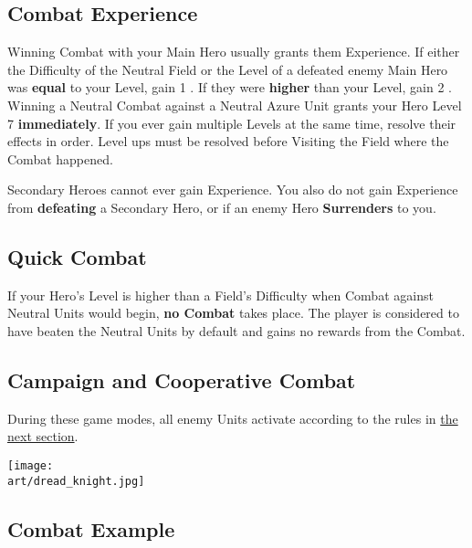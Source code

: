 \begin{multicols}{2}
\subsection*{\hypertarget{Combatexperience}{Combat Experience}}

Winning Combat with your Main Hero usually grants them Experience.
If either the Difficulty of the Neutral Field or the Level of a defeated enemy Main Hero was \textbf{equal} to your Level, gain 1 .
If they were \textbf{higher} than your Level, gain 2 .
Winning a Neutral Combat against a Neutral Azure  Unit grants your Hero Level 7 \textbf{immediately}.
If you ever gain multiple Levels at the same time, resolve their effects in order.
Level ups must be resolved before Visiting the Field where the Combat happened.\par
Secondary Heroes cannot ever gain Experience.
You also do not gain Experience from \textbf{defeating} a Secondary Hero, or if an enemy Hero \textbf{Surrenders} to you.

\subsection*{\hypertarget{Quick}{Quick Combat}}
If your Hero's Level is higher than a Field's Difficulty when Combat against Neutral Units would begin, \textbf{no Combat} takes place.
The player is considered to have beaten the Neutral Units by default and gains no rewards from the Combat.

\subsection*{Campaign and Cooperative Combat}
During these game modes, all enemy Units activate according to the rules in \hyperlink{AIrules}{the next section}.

\end{multicols}

\vspace*{\fill}
\begin{scaledfigure}[blanker]
  \centering
  \texttt{[image: \\art/dread\_knight.jpg]}
\end{scaledfigure}

\clearpage

\subsection*{Combat Example}

